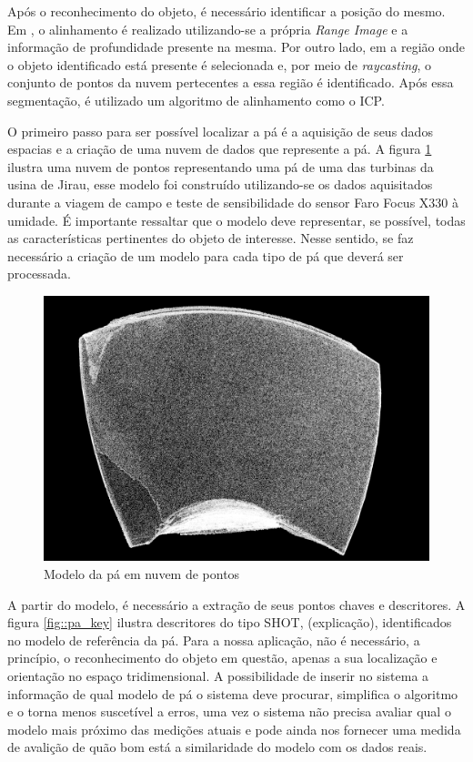 Após o reconhecimento do objeto, é necessário identificar a posição do mesmo. Em
\cite{Steder2009}, o alinhamento é realizado utilizando-se a própria
\textit{Range Image} e a informação de profundidade presente na mesma. Por outro
lado, em \cite{Nuchter2005} a região onde o objeto identificado está presente é
selecionada e, por meio de \textit{raycasting}, o conjunto de pontos da nuvem
pertecentes a essa região é identificado. Após essa segmentação, é utilizado um
algoritmo de alinhamento como o ICP.

O primeiro passo para ser possível localizar a pá é a aquisição de seus dados
espacias e a criação de uma nuvem de dados que represente a pá. A figura
\ref{fig::pa_pcd} ilustra uma nuvem de pontos representando uma pá de uma das
turbinas da usina de Jirau, esse modelo foi construído utilizando-se os dados
aquisitados durante a viagem de campo e teste de sensibilidade do sensor Faro
Focus X330 à umidade. É importante ressaltar que o modelo deve representar, se
possível, todas as características pertinentes do objeto de interesse. Nesse
sentido, se faz necessário a criação de um modelo para cada tipo de pá que
deverá ser processada. 


\begin{figure}[h!]
   \centering
   \includegraphics[width=0.95\columnwidth]{figs/localizacao/pa_pcd}
   \caption{Modelo da pá em nuvem de pontos}
   \label{fig::pa_pcd}
\end{figure}

A partir do modelo, é necessário a extração de seus pontos chaves e descritores.
A figura \ref{fig::pa_key} ilustra descritores do tipo SHOT, (explicação),
identificados no modelo de referência da pá. Para a nossa aplicação, não é
necessário, a princípio, o reconhecimento do objeto em questão, apenas a sua
localização e orientação no espaço tridimensional. A possibilidade de inserir no
sistema a informação de qual modelo de pá o sistema deve procurar, simplifica o
algoritmo e o torna menos suscetível a erros, uma vez o sistema não precisa
avaliar qual o modelo mais próximo das medições atuais e pode ainda nos
fornecer uma medida de avalição de quão bom está a similaridade do modelo com
os dados reais.

